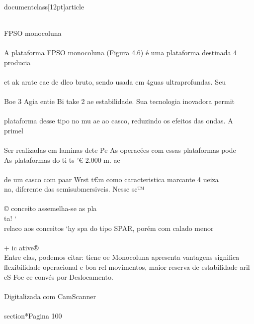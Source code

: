 \\documentclass[12pt]{article}
\begin{document}
\\
FPSO monocoluna\\
\\
A plataforma FPSO monocoluna (Figura 4.6) é uma plataforma destinada 4 producia\\
\\
et ak arate eae de dleo bruto, sendo usada em 4guas ultraprofundas. Seu\\
\\
Boe 3 Agia entie Bi take 2 ae estabilidade. Sua tecnologia inovadora permit\\
\\
plataforma desse tipo no mu ae ao casco, reduzindo os efeitos das ondas. A primel\\
\\
Ser realizadas em laminas dete Pe As operacées com essas plataformas pode\\
As plataformas do ti ts '€ 2.000 m. ae\\
\\
de um casco com paar Wrst t€m como caracteristica marcante 4 ueiza\\
na, diferente das semisubmersiveis. Nesse s¢™\\
\\
© conceito assemelha-se as pla\\
ta! ‘\\
relaco aos conceitos ‘hy spa do tipo SPAR, porém com calado menor\\
\\
+ ic ative®\\
Entre elas, podemos citar: tiene oe Monocoluna apresenta vantagens significa\\
flexibilidade operacional e boa rel movimentos, maior reserva de estabilidade aril\\
eS Foe ce convés por Deslocamento.\\
\\
Digitalizada com CamScanner\\

\\section*{Pagina 100}
\end{document}
